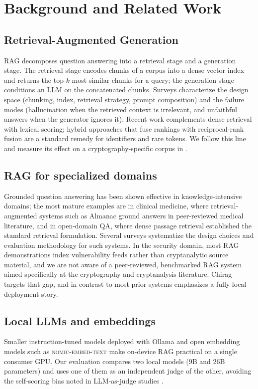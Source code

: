 \documentclass[version=submission]{iacrcc}
\begin{document}
\section{Background and Related Work}

\subsection{Retrieval-Augmented Generation}
RAG \cite{lewis2020rag} decomposes question answering into a retrieval stage
and a generation stage. The retrieval stage encodes chunks of a corpus into a
dense vector index and returns the top-$k$ most similar chunks for a query;
the generation stage conditions an LLM on the concatenated chunks. Surveys
\cite{gao2023survey} characterize the design space (chunking, index, retrieval
strategy, prompt composition) and the failure modes (hallucination when the
retrieved context is irrelevant, and unfaithful answers when the generator
ignores it). Recent work complements dense retrieval with lexical scoring;
hybrid approaches that fuse rankings with reciprocal-rank fusion
\cite{cormack2009rrf,robertson2009bm25} are a standard remedy for identifiers
and rare tokens. We follow this line and measure its effect on a
cryptography-specific corpus in .

\subsection{RAG for specialized domains}
Grounded question answering has been shown effective in knowledge-intensive
domains; the most mature examples are in clinical medicine, where
retrieval-augmented systems such as Almanac \cite{zakka2024almanac} ground
answers in peer-reviewed medical literature, and in open-domain QA, where
dense passage retrieval \cite{karpukhin2020dpr} established the standard
retrieval formulation. Several surveys \cite{gao2023survey} systematize the
design choices and evaluation methodology for such systems. In the security
domain, most RAG demonstrations index vulnerability feeds rather than
cryptanalytic source material, and we are not aware of a peer-reviewed,
benchmarked RAG system aimed specifically at the cryptography and
cryptanalysis literature. Chirag targets that gap, and in contrast to most
prior systems emphasizes a fully local deployment story.

\subsection{Local LLMs and embeddings}
Smaller instruction-tuned models deployed with Ollama \cite{ollama} and open
embedding models such as \textsc{nomic-embed-text} \cite{nomic2024} make
on-device RAG practical on a single consumer GPU. Our evaluation compares two
local models ($9$B and $26$B parameters) and uses one of them as an independent
judge of the other, avoiding the self-scoring bias noted in LLM-as-judge
studies \cite{zheng2023judging}.
\end{document}
